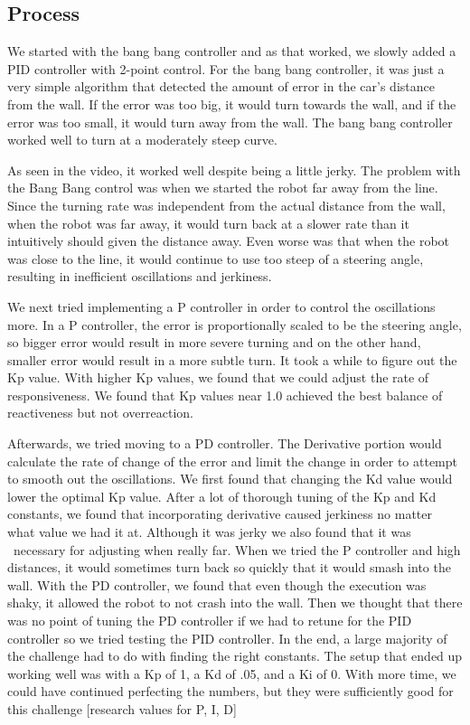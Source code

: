 \documentclass[journal, a4paper]{IEEEtran}
\begin{document}
\subsection{Process}
We started with the bang bang controller and as that worked, we slowly added a PID controller with 2-point control. For the bang bang controller, it was just a very simple algorithm that detected the amount of error in the car’s distance from the wall. If the error was too big, it would turn towards the wall, and if the error was too small, it would turn away from the wall. The bang bang controller worked well to turn at a moderately steep curve. 
\par As seen in the video, it worked well despite being a little jerky. The problem with the Bang Bang control was when we started the robot far away from the line. Since the turning rate was independent from the actual distance from the wall, when the robot was far away, it would turn back at a slower rate than it intuitively should given the distance away. Even worse was that when the robot was close to the line, it would continue to use too steep of a steering angle, resulting in inefficient oscillations and jerkiness. 
\par We next tried implementing a P controller in order to control the oscillations more. In a P controller, the error is proportionally scaled to be the steering angle, so bigger error would result in more severe turning and on the other hand, smaller error would result in a more subtle turn. It took a while to figure out the Kp value. With higher Kp values, we found that we could adjust the rate of responsiveness. We found that Kp values near 1.0 achieved the best balance of reactiveness but not overreaction. 
\par Afterwards, we tried moving to a PD controller. The Derivative portion would calculate the rate of change of the error and limit the change in order to attempt to smooth out the oscillations. We first found that changing the Kd value would lower the optimal Kp value. After a lot of thorough tuning of the Kp and Kd constants, we found that incorporating derivative caused jerkiness no matter what value we had it at. Although it was jerky we also found that it was  necessary for adjusting when really far. When we tried the P controller and high distances, it would sometimes turn back so quickly that it would smash into the wall. With the PD controller, we found that even though the execution was shaky, it allowed the robot to not crash into the wall. Then we thought that there was no point of tuning the PD controller if we had to retune for the PID controller so we tried testing the PID controller. In the end, a large majority of the challenge had to do with finding the right constants. The setup that ended up working well was with a Kp of 1, a Kd of .05, and a Ki of 0. With more time, we could have continued perfecting the numbers, but they were sufficiently good for this challenge [research values for P, I, D]
\end{document}
